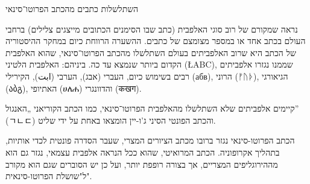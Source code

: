 השתלשלות כתבים מהכתב הפרוטו־סינאי

נראה שמקורם של רוב סוגי האלפבית (כתב שבו הסימנים הכתובים מייצגים צלילים) ברחבי העולם בכתב אחד או במספר מצומצם של כתבים. ההשערה הרווחת כיום במחקר ההיסטוריה של הכתב היא שרוב האלפביתים בעולם השתלשלו מהכתב הפרוטו־סינאי, שהוא האלפבית הקדום ביותר שנמצא עד כה. ביניהם: האלפבית הלטיני (\L{ABC}), שממנו נגזרו אלפביתים רבים בשימוש כיום, העברי (אבג), הערבי (ابت), הקירילי (абв), הרוני (ᚠᚢᚦ), הגיאורגי (აბგ), האתיופי (ሀለሐ) והדוונגרי (कखग).

קיימים אלפביתים שלא השתלשלו מהאלפבית הפרוטו־סינאי, כמו הכתב הקוריאני „האנגול” (ㄱㄴㄷ) והכתב הפונטי הסיני ג'ו-יין הומצאו באחת על ידי שליט.

הכתב הפרוטו-סינאי נגזר ברובו מכתב הציורים המצרי, שעבר הסדרה פונטית לכדי אותיות, בתהליך אקרופוניה. הכתב המרואיטי, שהוא ככל הנראה אלפבית עצמאי, נגזר גם הוא מההירוגליפים המצריים, אך בצורה רופפת יותר, ועל כן יש הסוברים שגם הוא מקורב ל"שושלת הפרוטו-סינאית".
